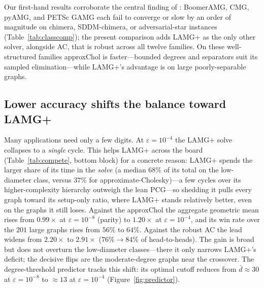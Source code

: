 \documentclass{siamart220329}
\begin{document}
Our first-hand results corroborate the central finding of \cite{gks2023}: BoomerAMG, CMG, pyAMG,
and PETSc GAMG each fail to converge or slow by an order of magnitude on chimera, SDDM-chimera, or
adversarial-star instances (Table~\ref{tab:classcomp}); the present comparison adds LAMG+ as the
only other solver, alongside AC, that is robust across all twelve families. On these well-structured families approxChol is faster---bounded degrees and separators
suit its sampled elimination---while LAMG+'s advantage is on large poorly-separable graphs.

\subsection{Lower accuracy shifts the balance toward LAMG+}\label{sec:tol4}
Many applications need only a few digits. At $\varepsilon=10^{-4}$ the LAMG+ solve collapses
to a \emph{single} cycle. This helps LAMG+ across the board
(Table~\ref{tab:compete}, bottom block) for a concrete reason: LAMG+ spends the larger share of its
time in the \emph{solve} (a median $68\%$ of its total on the low-diameter class, versus $37\%$ for
approximate-Cholesky)---a few cycles over its higher-complexity hierarchy outweigh the lean
PCG---so shedding it pulls every graph toward its setup-only ratio,
where LAMG+ stands relatively better, even on the graphs it still loses. Against the approxChol the aggregate geometric mean rises from
$0.99\times$ at $\varepsilon=10^{-8}$ (parity) to $1.20\times$ at $\varepsilon=10^{-4}$, and its win rate
over the $201$ large graphs rises from $56\%$ to $64\%$. Against the robust AC the lead widens from
$2.20\times$ to $2.91\times$ ($76\%\!\to\!84\%$ of head-to-heads). The gain is broad but does not
overturn the low-diameter classes---there it only narrows LAMG+'s deficit; the decisive flips are the
moderate-degree graphs near the crossover. The degree-threshold predictor tracks this shift: its optimal cutoff reduces from $\bar d\approx30$ at $\varepsilon=10^{-8}$ to $\approx13$ at $\varepsilon=10^{-4}$
(Figure~\ref{fig:predictor}).
\end{document}
